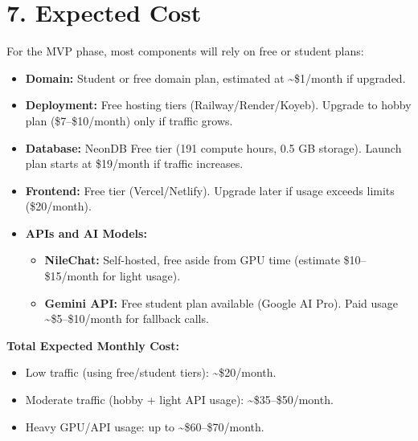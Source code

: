 \documentclass[12pt,a4paper]{article}
\begin{document}
\section*{7. Expected Cost}

For the MVP phase, most components will rely on free or student plans:

\begin{itemize}[leftmargin=1.2em]
    \item \textbf{Domain:} Student or free domain plan, estimated at \textasciitilde\$1/month if upgraded.
    \item \textbf{Deployment:} Free hosting tiers (Railway/Render/Koyeb). Upgrade to hobby plan (\$7--\$10/month) only if traffic grows.
    \item \textbf{Database:} NeonDB Free tier (191 compute hours, 0.5 GB storage). Launch plan starts at \$19/month if traffic increases.
    \item \textbf{Frontend:} Free tier (Vercel/Netlify). Upgrade later if usage exceeds limits (\$20/month).
    \item \textbf{APIs and AI Models:} 
    \begin{itemize}
        \item \textbf{NileChat:} Self-hosted, free aside from GPU time (estimate \$10--\$15/month for light usage).
        \item \textbf{Gemini API:} Free student plan available (Google AI Pro). Paid usage \textasciitilde\$5--\$10/month for fallback calls.
    \end{itemize}
\end{itemize}

\textbf{Total Expected Monthly Cost:}  
\begin{itemize}
    \item Low traffic (using free/student tiers): \textasciitilde\$20/month.
    \item Moderate traffic (hobby + light API usage): \textasciitilde\$35--\$50/month.
    \item Heavy GPU/API usage: up to \textasciitilde\$60--\$70/month.
\end{itemize}
\end{document}
